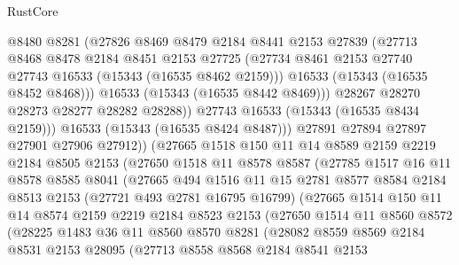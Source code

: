 \begin{lexlean}{RustCore}
\begin{coremodule}
                  @8480
                  @8281
                  (@27826
                    @8469
                    @8479
                    @2184
                    @8441
                    @2153
                    @27839
                    (@27713
                      @8468
                      @8478
                      @2184
                      @8451
                      @2153
                      @27725
                      (@27734 @8461 @2153 @27740 @27743 @16533 (@15343 (@16535 @8462 @2159)))
                      @16533
                      (@15343 (@16535 @8452 @8468)))
                    @16533
                    (@15343 (@16535 @8442 @8469)))
                  @28267
                  @28270
                  @28273
                  @28277
                  @28282
                  @28288))
              @27743
              @16533
              (@15343 (@16535 @8434 @2159)))
            @16533
            (@15343 (@16535 @8424 @8487)))
          @27891
          @27894
          @27897
          @27901
          @27906
          @27912))
      (@27665
        @1518
        @150
        @11
        @14
        @8589
        @2159
        @2219
        @2184
        @8505
        @2153
        (@27650
          @1518
          @11
          @8578
          @8587
          (@27785
            @1517
            @16
            @11
            @8578
            @8585
            @8041
            (@27665
              @494
              @1516
              @11
              @15
              @2781
              @8577
              @8584
              @2184
              @8513
              @2153
              (@27721 @493 @2781 @16795 @16799)
              (@27665
                @1514
                @150
                @11
                @14
                @8574
                @2159
                @2219
                @2184
                @8523
                @2153
                (@27650
                  @1514
                  @11
                  @8560
                  @8572
                  (@28225
                    @1483
                    @36
                    @11
                    @8560
                    @8570
                    @8281
                    (@28082
                      @8559
                      @8569
                      @2184
                      @8531
                      @2153
                      @28095
                      (@27713
                        @8558
                        @8568
                        @2184
                        @8541
                        @2153

\end{coremodule}
\end{lexlean}
